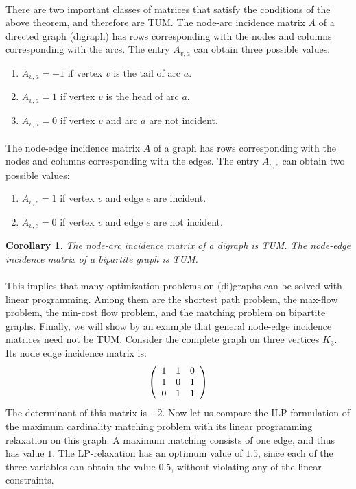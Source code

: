 \documentclass[titlepage]{book}
\theoremstyle{plain}
\newtheorem{corollary}[theorem]{Corollary}
\theoremstyle{definition}
\theoremstyle{remark}
\begin{document}
\paragraph{}
There are two important classes of matrices that satisfy the conditions of the above theorem, and therefore are TUM. The node-arc incidence matrix $A$ of a directed graph (digraph) has rows corresponding with
the nodes and columns corresponding with the arcs. The entry $A_{v,a}$ can obtain three possible values:
\begin{enumerate}
 \item $A_{v,a}=-1$ if vertex $v$ is the tail of arc $a$.
 \item $A_{v,a}=1$ if vertex $v$ is the head of arc $a$.
 \item $A_{v,a}=0$ if vertex $v$ and arc $a$ are not incident.
\end{enumerate}

\paragraph{}
The node-edge incidence matrix $A$ of a graph has rows corresponding with the nodes and columns corresponding with the edges. The entry $A_{v,e}$ can obtain two possible values:
\begin{enumerate}
 \item $A_{v,e}=1$ if vertex $v$ and edge $e$ are incident.
 \item $A_{v,e}=0$ if vertex $v$ and edge $e$ are not incident.
\end{enumerate}

\begin{corollary}
The node-arc incidence matrix of a digraph is TUM. The node-edge incidence matrix of a bipartite graph is TUM.
\end{corollary}

\paragraph{}
This implies that many optimization problems on (di)graphs can be solved with linear programming. Among them are the shortest path problem, the max-flow problem, the min-cost flow problem, and the matching problem on bipartite graphs. Finally, we will show by an example that general node-edge incidence matrices need not be TUM. Consider the complete graph on three vertices $K_3$. Its node edge
incidence matrix is:
\begin{equation}
\left( \begin{array}{ccc}
1&1&0\\
1&0&1\\
0&1&1
\end{array} \right)
\end{equation}
The determinant of this matrix is $-2$. Now let us compare the ILP formulation of the maximum cardinality matching problem with its linear programming relaxation on this graph. A maximum matching consists of one edge, and thus has value $1$. The LP-relaxation has an optimum value of $1.5$, since each of the three variables can obtain the value $0.5$, without violating any of the linear constraints.
\end{document}
